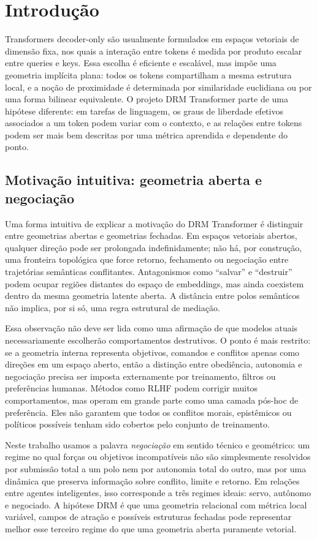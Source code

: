\section{Introdução}

Transformers decoder-only são usualmente formulados em espaços vetoriais de
dimensão fixa, nos quais a interação entre tokens é medida por produto escalar
entre queries e keys. Essa escolha é eficiente e escalável, mas impõe uma
geometria implícita plana: todos os tokens compartilham a mesma estrutura local,
e a noção de proximidade é determinada por similaridade euclidiana ou por uma
forma bilinear equivalente. O projeto DRM Transformer parte de uma hipótese
diferente: em tarefas de linguagem, os graus de liberdade efetivos associados a
um token podem variar com o contexto, e as relações entre tokens podem ser mais
bem descritas por uma métrica aprendida e dependente do ponto.

\subsection{Motivação intuitiva: geometria aberta e negociação}

Uma forma intuitiva de explicar a motivação do DRM Transformer é distinguir
entre geometrias abertas e geometrias fechadas. Em espaços vetoriais abertos,
qualquer direção pode ser prolongada indefinidamente; não há, por construção,
uma fronteira topológica que force retorno, fechamento ou negociação entre
trajetórias semânticas conflitantes. Antagonismos como ``salvar'' e
``destruir'' podem ocupar regiões distantes do espaço de embeddings, mas ainda
coexistem dentro da mesma geometria latente aberta. A distância entre polos
semânticos não implica, por si só, uma regra estrutural de mediação.

Essa observação não deve ser lida como uma afirmação de que modelos atuais
necessariamente escolherão comportamentos destrutivos. O ponto é mais restrito:
se a geometria interna representa objetivos, comandos e conflitos apenas como
direções em um espaço aberto, então a distinção entre obediência, autonomia e
negociação precisa ser imposta externamente por treinamento, filtros ou
preferências humanas. Métodos como RLHF podem corrigir muitos comportamentos,
mas operam em grande parte como uma camada pós-hoc de preferência. Eles não
garantem que todos os conflitos morais, epistêmicos ou políticos possíveis
tenham sido cobertos pelo conjunto de treinamento.

Neste trabalho usamos a palavra \emph{negociação} em sentido técnico e
geométrico: um regime no qual forças ou objetivos incompatíveis não são
simplesmente resolvidos por submissão total a um polo nem por autonomia total do
outro, mas por uma dinâmica que preserva informação sobre conflito, limite e
retorno. Em relações entre agentes inteligentes, isso corresponde a três
regimes ideais: servo, autônomo e negociado. A hipótese DRM é que uma geometria
relacional com métrica local variável, campos de atração e possíveis estruturas
fechadas pode representar melhor esse terceiro regime do que uma geometria
aberta puramente vetorial.

